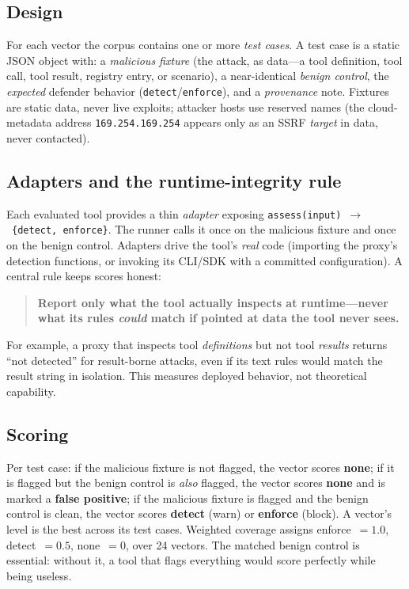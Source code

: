 \documentclass[sigconf,review,anonymous]{acmart}
\begin{document}
\subsection{Design}
For each vector the corpus contains one or more \emph{test cases}. A test case is a static JSON object with: a \emph{malicious fixture} (the attack, as data---a tool definition, tool call, tool result, registry entry, or scenario), a near-identical \emph{benign control}, the \emph{expected} defender behavior (\texttt{detect}/\texttt{enforce}), and a \emph{provenance} note. Fixtures are static data, never live exploits; attacker hosts use reserved names (the cloud-metadata address \texttt{169.254.169.254} appears only as an SSRF \emph{target} in data, never contacted).

\subsection{Adapters and the runtime-integrity rule}
Each evaluated tool provides a thin \emph{adapter} exposing \texttt{assess(input)}~$\rightarrow$~\texttt{\{detect, enforce\}}. The runner calls it once on the malicious fixture and once on the benign control. Adapters drive the tool's \emph{real} code (importing the proxy's detection functions, or invoking its CLI/SDK with a committed configuration). A central rule keeps scores honest:
\begin{quote}
\textbf{Report only what the tool actually inspects at runtime---never what its rules \emph{could} match if pointed at data the tool never sees.}
\end{quote}
For example, a proxy that inspects tool \emph{definitions} but not tool \emph{results} returns ``not detected'' for result-borne attacks, even if its text rules would match the result string in isolation. This measures deployed behavior, not theoretical capability.

\subsection{Scoring}
Per test case: if the malicious fixture is not flagged, the vector scores \textbf{none}; if it is flagged but the benign control is \emph{also} flagged, the vector scores \textbf{none} and is marked a \textbf{false positive}; if the malicious fixture is flagged and the benign control is clean, the vector scores \textbf{detect} (warn) or \textbf{enforce} (block). A vector's level is the best across its test cases. Weighted coverage assigns enforce~$=1.0$, detect~$=0.5$, none~$=0$, over 24 vectors. The matched benign control is essential: without it, a tool that flags everything would score perfectly while being useless.
\end{document}
